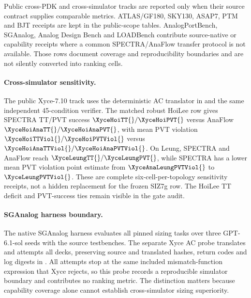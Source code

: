 Public cross-PDK and cross-simulator tracks are reported only when their source
contract supplies comparable metrics. ATLAS/GF180, SKY130, ASAP7, PTM and BJT
receipts are kept in the public-scope tables. AnalogPortBench, SGAnalog,
Analog Design Bench and LOADBench contribute source-native or capability
receipts where a common SPECTRA/AnaFlow transfer protocol is not available.
Those rows document coverage and reproducibility boundaries and are not silently
converted into ranking cells.

\paragraph{Cross-simulator sensitivity.}
The public Xyce-7.10 track uses the deterministic AC translator in
 and the same independent 45-condition
verifier. The matched robust HoiLee row gives SPECTRA TT/PVT success
$\XyceHoiTT{}/\XyceHoiPVT{}$ versus AnaFlow $\XyceHoiAnaTT{}/\XyceHoiAnaPVT{}$, with mean PVT violation
$\XyceHoiTTViol{}/\XyceHoiPVTViol{}$ versus $\XyceHoiAnaTTViol{}/\XyceHoiAnaPVTViol{}$. On Leung, SPECTRA and AnaFlow reach
$\XyceLeungTT{}/\XyceLeungPVT{}$, while SPECTRA has a lower mean PVT violation point estimate
from $\XyceAnaLeungPVTViol{}$ to $\XyceLeungPVTViol{}$.
These are complete six-cell-per-topology sensitivity receipts, not a hidden
replacement for the frozen SIZ7g row. The HoiLee TT deficit and PVT-success
ties remain visible in the gate audit.

\paragraph{SGAnalog harness boundary.}
The native SGAnalog harness evaluates all \SGAnalogTasks{} pinned sizing tasks over three
GPT-6.1-sol seeds with the source testbenches. The separate Xyce AC probe
translates and attempts all \SGAnalogTasks{} decks, preserving source and translated hashes,
return codes and log digests in
. All \SGAnalogFailures{} attempts stop at the
same included mismatch-function expression that Xyce rejects, so this probe
records a reproducible simulator boundary and contributes no ranking metric.
The distinction matters because capability coverage alone cannot establish
cross-simulator sizing superiority.
